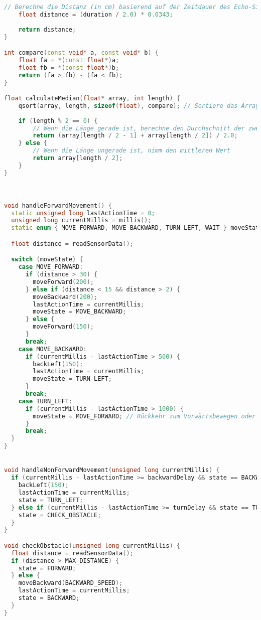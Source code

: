 \documentclass{vorlage-design-main}
\begin{document}
\begin{lstlisting}[language={C++}]
    // Berechne die Distanz (in cm) basierend auf der Zeitdauer des Echo-Signals
    float distance = (duration / 2.0) * 0.0343;
    
    return distance;
}

int compare(const void* a, const void* b) {
    float fa = *(const float*)a;
    float fb = *(const float*)b;
    return (fa > fb) - (fa < fb);
}

float calculateMedian(float* array, int length) {
    qsort(array, length, sizeof(float), compare); // Sortiere das Array
    
    if (length % 2 == 0) {
        // Wenn die Länge gerade ist, berechne den Durchschnitt der zwei mittleren Werte
        return (array[length / 2 - 1] + array[length / 2]) / 2.0;
    } else {
        // Wenn die Länge ungerade ist, nimm den mittleren Wert
        return array[length / 2];
    }
}



void handleForwardMovement() {
  static unsigned long lastActionTime = 0;
  unsigned long currentMillis = millis();
  static enum { MOVE_FORWARD, MOVE_BACKWARD, TURN_LEFT, WAIT } moveState = MOVE_FORWARD;

  float distance = readSensorData();

  switch (moveState) {
    case MOVE_FORWARD:
      if (distance > 30) {
        moveForward(200);
      } else if (distance < 15 && distance > 2) {
        moveBackward(200);
        lastActionTime = currentMillis;
        moveState = MOVE_BACKWARD;
      } else {
        moveForward(150);
      }
      break;
    case MOVE_BACKWARD:
      if (currentMillis - lastActionTime > 500) {
        backLeft(150);
        lastActionTime = currentMillis;
        moveState = TURN_LEFT;
      }
      break;
    case TURN_LEFT:
      if (currentMillis - lastActionTime > 1000) {
        moveState = MOVE_FORWARD; // Rückkehr zum Vorwärtsbewegen oder zu einem anderen Zustand
      }
      break;
  }
}


void handleNonForwardMovement(unsigned long currentMillis) {
  if (currentMillis - lastActionTime >= backwardDelay && state == BACKWARD) {
    backLeft(150);
    lastActionTime = currentMillis;
    state = TURN_LEFT;
  } else if (currentMillis - lastActionTime >= turnDelay && state == TURN_LEFT) {
    state = CHECK_OBSTACLE;
  }
}

void checkObstacle(unsigned long currentMillis) {
  float distance = readSensorData();
  if (distance > MAX_DISTANCE) {
    state = FORWARD;
  } else {
    moveBackward(BACKWARD_SPEED);
    lastActionTime = currentMillis;
    state = BACKWARD;
  }
}



\end{lstlisting}
\end{document}
